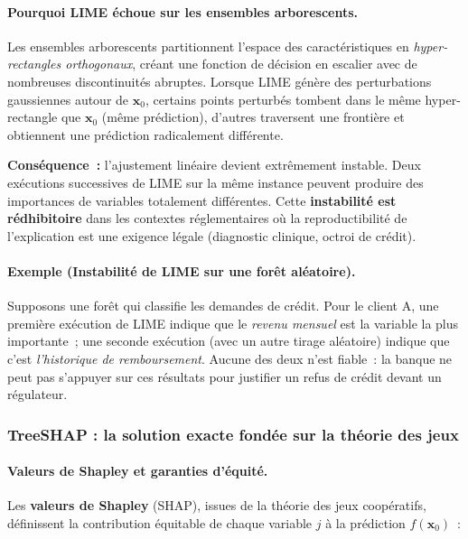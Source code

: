 \paragraph{Pourquoi LIME échoue sur les ensembles arborescents.}

Les ensembles arborescents partitionnent l'espace des caractéristiques en
\textit{hyper-rectangles orthogonaux}, créant une fonction de décision en escalier avec de
nombreuses discontinuités abruptes. Lorsque LIME génère des perturbations gaussiennes
autour de $\mathbf{x}_0$, certains points perturbés tombent dans le même hyper-rectangle que
$\mathbf{x}_0$ (même prédiction), d'autres traversent une frontière et obtiennent une prédiction
radicalement différente.

\textbf{Conséquence~:} l'ajustement linéaire devient extrêmement instable. Deux
exécutions successives de LIME sur la même instance peuvent produire des importances
de variables totalement différentes. Cette \textbf{instabilité est rédhibitoire} dans les
contextes réglementaires où la reproductibilité de l'explication est une exigence légale
(diagnostic clinique, octroi de crédit).

\paragraph{Exemple (Instabilité de LIME sur une forêt aléatoire).}
Supposons une forêt qui classifie les demandes de crédit. Pour le client A, une première
exécution de LIME indique que le \textit{revenu mensuel} est la variable la plus importante~;
une seconde exécution (avec un autre tirage aléatoire) indique que c'est \textit{l'historique
de remboursement}. Aucune des deux n'est fiable~: la banque ne peut pas s'appuyer sur
ces résultats pour justifier un refus de crédit devant un régulateur.

\subsubsection{TreeSHAP : la solution exacte fondée sur la théorie des jeux}

\paragraph{Valeurs de Shapley et garanties d'équité.}

Les \textbf{valeurs de Shapley} (SHAP), issues de la théorie des jeux coopératifs, définissent
la contribution équitable de chaque variable $j$ à la prédiction $f(\mathbf{x}_0)$~:

